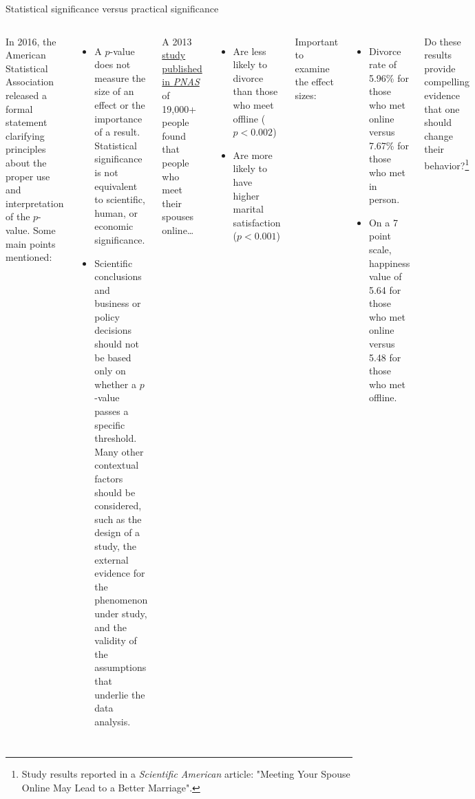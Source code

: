 \documentclass[
  ignorenonframetext,
  aspectratio=169]{beamer}
\newcommand{\columnsbegin}{\begin{columns}}
\newcommand{\columnsend}{\end{columns}}
\begin{document}
\begin{frame}{Statistical significance versus practical significance}
\protect\hypertarget{statistical-significance-versus-practical-significance}{}
\columnsbegin


\footnotesize

In 2016, the American Statistical Association released a formal
statement clarifying principles about the proper use and interpretation
of the \(p\)-value. Some main points mentioned:

\begin{itemize}
\item
  A \(p\)-value does not measure the size of an effect or the importance
  of a result. Statistical significance is not equivalent to scientific,
  human, or economic significance.
\item
  Scientific conclusions and business or policy decisions should not be
  based only on whether a \(p\)-value passes a specific threshold. Many
  other contextual factors should be considered, such as the design of a
  study, the external evidence for the phenomenon under study, and the
  validity of the assumptions that underlie the data analysis.
\end{itemize}


\footnotesize

A 2013
\href{https://www.pnas.org/doi/10.1073/pnas.1222447110}{study published in \textit{PNAS}}
of 19,000+ people found that people who meet their spouses
online\ldots{}

\begin{itemize}
\item
  Are less likely to divorce than those who meet offline (\(p < 0.002\))
\item
  Are more likely to have higher marital satisfaction (\(p < 0.001\))
\end{itemize}

\vspace{0.25cm}

Important to examine the effect sizes:

\begin{itemize}
\item
  Divorce rate of 5.96\% for those who met online versus 7.67\% for
  those who met in person.
\item
  On a 7 point scale, happiness value of 5.64 for those who met online
  versus 5.48 for those who met offline.
\end{itemize}

Do these results provide compelling evidence that one should change
their
behavior?\footnote{\scriptsize Study results reported in a \textit{Scientific American} article: "Meeting Your Spouse Online May Lead to a Better Marriage".}

\columnsend
\end{frame}
\end{document}
